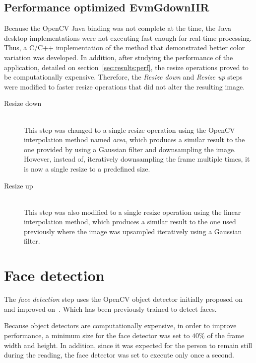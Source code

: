 \subsection{Performance optimized EvmGdownIIR} \label{sec:impl:evm:final}

Because the OpenCV Java binding was not complete at the time, the Java desktop
implementations were not executing fast enough for real-time processing. Thus,
a C/C++ implementation of the method that demonstrated better color variation
was developed. In addition, after studying the performance of the application,
detailed on section~\ref{sec:results:perf}, the resize operations proved to be
computationally expensive. Therefore, the \emph{Resize down} and
\emph{Resize up} steps were modified to faster resize operations that did not
alter the resulting image.

\begin{description}
  \item[Resize down]\hfill\\
        This step was changed to a single resize operation using the
        OpenCV interpolation method named \emph{area}, which produces a similar
        result to the one provided by using a Gaussian filter and downsampling
        the image. However, instead of, iteratively downsampling the frame
        multiple times, it is now a single resize to a predefined size.

  \item[Resize up]\hfill\\
        This step was also modified to a single resize operation using the
        linear interpolation method, which produces a similar result to the
        one used previously where the image was upsampled iteratively using
        a Gaussian filter.
\end{description}

\section{Face detection} \label{sec:impl:face}

The \emph{face detection} step uses the OpenCV object detector initially
proposed on~\cite{Viola2001Rapid} and improved on~\cite{Lienhart2002Extended}.
Which has been previously trained to detect faces.

Because object detectors are computationally expensive, in order to
improve performance, a minimum size for the face detector was set to $40\%$
of the frame width and height. In addition, since it was expected for the
person to remain still during the reading, the face detector was set to execute
only once a second.

